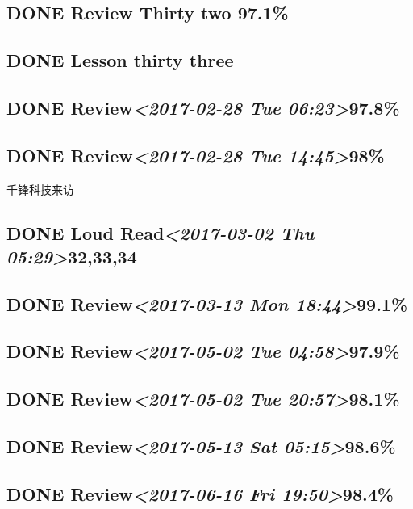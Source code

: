 \documentclass[11pt]{ctexart}
\begin{document}
\subsection{{\bfseries\sffamily DONE} Review Thirty two 97.1\%}
\label{sec:org94daad7}

\subsection{{\bfseries\sffamily DONE} Lesson thirty three}
\label{sec:org1f5ddaf}
\subsection{{\bfseries\sffamily DONE} Review\textit{<2017-02-28 Tue 06:23>}97.8\%}
\label{sec:org580049b}
\subsection{{\bfseries\sffamily DONE} Review\textit{<2017-02-28 Tue 14:45>}98\%}
\label{sec:org5795722}
千锋科技来访
\subsection{{\bfseries\sffamily DONE} Loud Read\textit{<2017-03-02 Thu 05:29>}32,33,34}
\label{sec:orgfc4670e}
\subsection{{\bfseries\sffamily DONE} Review\textit{<2017-03-13 Mon 18:44>}99.1\%}
\label{sec:orgf9da646}
\subsection{{\bfseries\sffamily DONE} Review\textit{<2017-05-02 Tue 04:58>}97.9\%}
\label{sec:orgd3b525e}
\subsection{{\bfseries\sffamily DONE} Review\textit{<2017-05-02 Tue 20:57>}98.1\%}
\label{sec:org408a64a}
\subsection{{\bfseries\sffamily DONE} Review\textit{<2017-05-13 Sat 05:15>}98.6\%}
\label{sec:org6018f22}
\subsection{{\bfseries\sffamily DONE} Review\textit{<2017-06-16 Fri 19:50>}98.4\%}
\label{sec:org6c86ce7}
\end{document}
